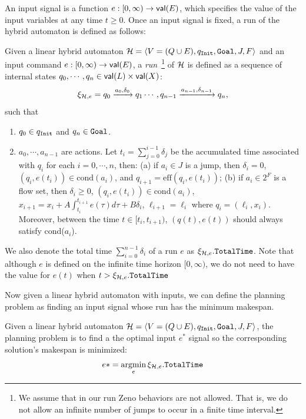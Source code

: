 \documentclass[sigconf]{acmart}
\DeclareMathOperator*{\argmin}{argmin}
\begin{document}
An input signal is a function $e: [0, \infty) \rightarrow {\mathsf{val}}(E)$, which specifies the value of the input variables at any time $t \geq 0$.
Once an input signal is fixed, a run of the hybrid automaton is defined as follows:

\begin{definition}
\label{def:run}
Given a linear hybrid automaton $\mathcal{H} = \langle V = (Q \cup E), q_\mathtt{Init}, \mathtt{Goal}, J, F \rangle $ and an input command $e: [0, \infty) \rightarrow {\mathsf{val}}(E)$, a {\em run}~\footnote{We assume that in our run Zeno behaviors are not allowed. That is, we do not allow an infinite number of jumps to occur in a finite time interval.} of $\mathcal{H}$ is defined as a sequence of internal states $q_0,\cdots,q_n \in {\mathsf{val}}(L) \times {\mathsf{val}}(X)$:
\[
\xi_{\mathcal{H},e} = q_0 \xrightarrow{a_0, \delta_0} q_1 \cdots,q_{n-1} \xrightarrow{a_{n-1}, \delta_{n-1}} q_n,
\]
such that
\begin{enumerate}
    \item $q_0 \in q_\mathtt{Init}$ and $q_n \in \mathtt{Goal}$.
    \item $a_0,\cdots,a_{n-1}$ are actions. Let $t_i = \sum_{j=0}^{i-1}\delta_j$ be the accumulated time associated with $q_i$ for each $i = 0,\cdots,n$, then: (a) if $a_i \in J$ is a jump, then $\delta_i = 0$, $(q_i, e(t_i)) \in \mbox{cond}(a_i)$, and $q_{i+1} = \mbox{eff}(q_i, e(t_i))$; (b) if $a_i \in 2^F$ is a flow set, then $\delta_i \geq 0$, $(q_i, e(t_i)) \in \mbox{cond}(a_i)$, $x_{i+1} = x_i + A \int_{t_i}^{t_{i+1}} e(\tau) d\tau + B \delta_i$, $\ell_{i+1} = \ell_{i}$ where $q_i = (\ell_i, x_i)$. Moreover, between the time $t \in [t_i, t_{i+1})$, $(q(t),e(t))$ should always satisfy cond($a_i$). 
\end{enumerate}
We also denote the total time $\sum_{i=0}^{n-1} \delta_i$ of a run $e$ as $\xi_{\mathcal{H},e}.\mathtt{TotalTime}$. Note that although $e$ is defined on the infinite time horizon $[0,\infty)$, we do not need to have the value for $e(t)$ when $t > \xi_{\mathcal{H},e}.\mathtt{TotalTime}$
\end{definition}

Now given a linear hybrid automaton with inputs, we can define the planning problem as finding an input signal whose run has the minimum makespan.
\begin{definition}\label{def:solution}
Given a linear hybrid automaton $\mathcal{H} = \langle V = (Q \cup E), q_\mathtt{Init}, \mathtt{Goal}, J, F \rangle $, the planning problem is to find a the optimal input $e^*$ signal so the corresponding solution's makespan is minimized:
\[
e* = \argmin_{e} \xi_{\hybrid,e}.\mathtt{TotalTime}
\]
\end{definition}
 
\end{document}
